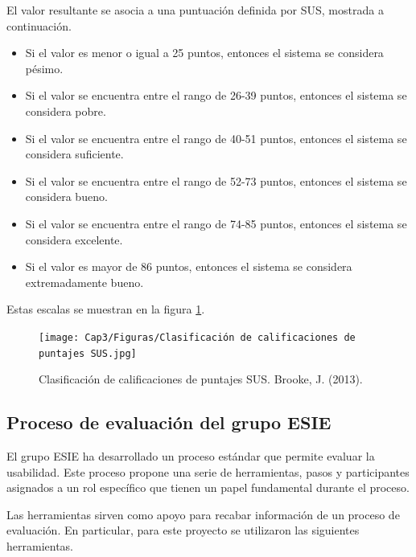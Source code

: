 El valor resultante se asocia a una puntuación definida por SUS, mostrada a continuación.

\begin{itemize}
  \item Si el valor es menor o igual a 25 puntos, entonces el sistema se considera pésimo.
  \item Si el valor se encuentra entre el rango de 26-39 puntos, entonces el sistema se considera pobre.
  \item Si el valor se encuentra entre el rango de 40-51 puntos, entonces el sistema se considera suficiente.
  \item Si el valor se encuentra entre el rango de 52-73 puntos, entonces el sistema se considera bueno.
  \item Si el valor se encuentra entre el rango de 74-85 puntos, entonces el sistema se considera excelente.
  \item Si el valor es mayor de 86 puntos, entonces el sistema se considera extremadamente bueno.
\end{itemize}

Estas escalas se muestran en la figura \ref{fig:36}.

\begin{figure}[H]
  \centering
  \texttt{[image: Cap3/Figuras/Clasificación de calificaciones de puntajes SUS.jpg]}
  \caption{Clasificación de calificaciones de puntajes SUS. Brooke, J. (2013).}
  \label{fig:36}
\end{figure}


\subsection{Proceso de evaluación del grupo ESIE}
\label{ESIECap3}

El grupo ESIE ha desarrollado un proceso estándar que permite evaluar la usabilidad. Este proceso propone una serie de herramientas, pasos y participantes asignados a un rol específico que tienen un papel fundamental durante el proceso.

Las herramientas sirven como apoyo para recabar información de un proceso de evaluación. En particular, para este proyecto se utilizaron las siguientes herramientas.

